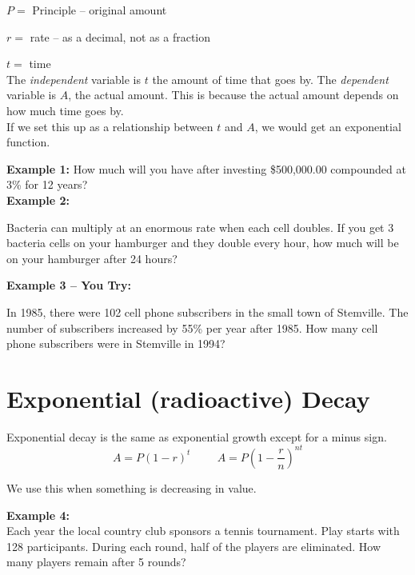 \documentclass[12pt]{article}
\begin{document}
$P=$ Principle -- original amount

$r=$ rate -- as a decimal, not as a fraction

$t=$ time\\

The \textit{independent} variable is $t$ the amount of time that goes by. The \textit{dependent} variable is $A$, the actual amount. This is because the actual amount depends on how much time goes by.\\ If we set this up as a relationship between $t$ and $A$, we would get an exponential function.

\hrulefill

\textbf{Example 1:}
How much will you have after investing \$500,000.00 compounded at 3\% for 12 years?\\


\vspace{1in}
\textbf{Example 2:}

Bacteria can multiply at an enormous rate when each cell doubles. If you get 3 bacteria cells on your hamburger and they double every hour, how much will be on your hamburger after 24 hours?\\

\vspace{1in}

\textbf{Example 3 -- You Try:}

In 1985, there were 102 cell phone subscribers in the small town of Stemville.  The number of subscribers increased by 55\% per year after 1985.  How many cell phone subscribers were in Stemville in 1994?

\pagebreak

\section{Exponential (radioactive) Decay}

Exponential decay is the same as exponential growth except for a minus sign.\\

$$A=P(1-r)^t \hspace{1cm}  A=P\left(1-\frac{r}{n}\right)^{nt}$$

We use this when something is decreasing in value.\\

\hrulefill

\textbf{Example 4:}\\
Each year the local country club sponsors a tennis tournament.  Play starts with 128 participants.  During each round, half of the players are eliminated.  How many players remain after 5 rounds?\\
\end{document}
